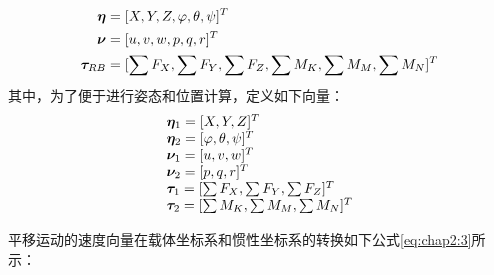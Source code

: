 \begin{equation}
\centering
\label{eq:chap2:1}
\begin{aligned}
 {\bm{\eta}}  &= {[X,Y,Z,\varphi ,\theta ,\psi ]^T} \\
 {\bm{\nu}} &= {[u,v,w,p,q,r]^T} \\
 {\bm{\tau}_{RB}} &= {[ \sum {F_X}, \sum {F_Y}, \sum {F_Z}, \sum {M_K}, \sum {M_M}, \sum {M_N}]^T}\\
 \end{aligned}
 \end{equation}
 其中，为了便于进行姿态和位置计算，定义如下向量：
 \begin{equation*}
 \centering
 \label{eq:chap2:2}
 \begin{array}{l}
 {{\bm{\eta}} _1} = {[X,Y,Z]^T} \\
 {{\bm{\eta}} _2} = {[\varphi ,\theta ,\psi ]^T}\\
 {{\bm{\nu}} _1}= {[u,v,w]^T}\\
 {{\bm{\nu}} _2}= {[p,q,r]^T}\\
 {{\bm{\tau}}_1} = {[ \sum {F_X}, \sum {F_Y}, \sum {F_Z}]^T}\\
 {{\bm{\tau}}_2} = {[ \sum {M_K}, \sum {M_M}, \sum {M_N}]^T}\\
 \end{array}
 \end{equation*}



平移运动的速度向量在载体坐标系和惯性坐标系的转换如下公式\ref{eq:chap2:3}所示：


